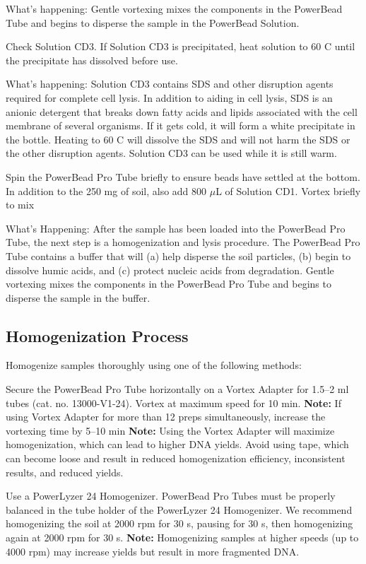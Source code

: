 \documentclass[12pt]{SOP5_beta}\usepackage[]{graphicx}\usepackage[]{xcolor}
\begin{document}
\noindent What's happening: Gentle vortexing mixes the components in the PowerBead Tube and begins to disperse the sample in the PowerBead Solution.

\NP Check Solution CD3. If Solution CD3 is precipitated, heat solution to 60 \degree C until the precipitate has dissolved before use.

\noindent What's happening: Solution CD3 contains SDS and other disruption agents required for complete cell lysis. In addition to aiding in cell lysis, SDS is an anionic detergent that breaks down fatty acids and lipids associated with the cell membrane of several organisms. If it gets cold, it will form a white precipitate in the bottle. Heating to 60 \degree C will dissolve the SDS and will not harm the SDS or the other disruption agents. Solution CD3 can be used while it is still warm.

\NP Spin the PowerBead Pro Tube briefly to ensure beads have settled at the bottom. In addition to the 250 mg of soil, also add 800 $\mu$L of Solution CD1. Vortex briefly to mix

\noindent What's Happening: After the sample has been loaded into the PowerBead Pro Tube, the next step is a homogenization and lysis procedure. The PowerBead Pro Tube contains a buffer that will (a) help disperse the soil particles, (b) begin to dissolve humic acids, and (c) protect nucleic acids from degradation. Gentle vortexing mixes the components in the PowerBead Pro Tube and begins to disperse the sample in the buffer.

\subsection*{Homogenization Process} 
\NP Homogenize samples thoroughly using one of the following methods: 
\begin{itemize*}
  \item Secure the PowerBead Pro Tube horizontally on a Vortex Adapter for 1.5–2 ml tubes (cat. no. 13000-V1-24). Vortex at maximum speed for 10 min. \textbf{Note:} If using Vortex Adapter for more than 12 preps simultaneously, increase the vortexing time by 5–10 min \textbf{Note:} Using the Vortex Adapter will maximize homogenization, which can lead to higher DNA yields. Avoid using tape, which can become loose and result in reduced homogenization efficiency, inconsistent results, and reduced yields.
  \item Use a PowerLyzer 24 Homogenizer. PowerBead Pro Tubes must be properly balanced in the tube holder of the PowerLyzer 24 Homogenizer. We recommend homogenizing the soil at 2000 rpm for 30 s, pausing for 30 s, then homogenizing again at 2000 rpm for 30 s. \textbf{Note:} Homogenizing samples at higher speeds (up to 4000 rpm) may increase yields but result in more fragmented DNA.
\end{itemize*}
\end{document}

